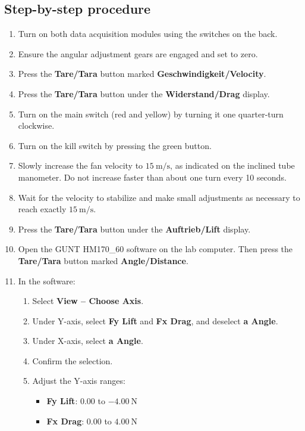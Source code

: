 \documentclass[12pt,letterpaper]{article}
\begin{document}
\subsection*{Step-by-step procedure}
\begin{enumerate}[leftmargin=*, label=\arabic*.]
    \item Turn on both data acquisition modules using the switches on the back.
    \item Ensure the angular adjustment gears are engaged and set to zero.
    \item Press the \textbf{Tare/Tara} button marked \textbf{Geschwindigkeit/Velocity}.
    \item Press the \textbf{Tare/Tara} button under the \textbf{Widerstand/Drag} display.
    \item Turn on the main switch (red and yellow) by turning it one quarter-turn clockwise.
    \item Turn on the kill switch by pressing the green button.
    \item Slowly increase the fan velocity to \(15~\text{m/s}\), as indicated on the inclined tube manometer. Do not increase faster than about one turn every 10 seconds.
    \item Wait for the velocity to stabilize and make small adjustments as necessary to reach exactly \(15~\text{m/s}\).
    \item Press the \textbf{Tare/Tara} button under the \textbf{Auftrieb/Lift} display.
    \item Open the GUNT HM170\_60 software on the lab computer. Then press the \textbf{Tare/Tara} button marked \textbf{Angle/Distance}.
    \item In the software:
    \begin{enumerate}[label=\alph*.]
        \item Select \textbf{View -- Choose Axis}.
        \item Under Y-axis, select \textbf{Fy Lift} and \textbf{Fx Drag}, and deselect \textbf{a Angle}.
        \item Under X-axis, select \textbf{a Angle}.
        \item Confirm the selection.
        \item Adjust the Y-axis ranges:
        \begin{itemize}
            \item \textbf{Fy Lift}: \(0.00\) to \(-4.00~\text{N}\)
            \item \textbf{Fx Drag}: \(0.00\) to \(4.00~\text{N}\)

\end{itemize}
\end{enumerate}
\end{enumerate}
\end{document}
